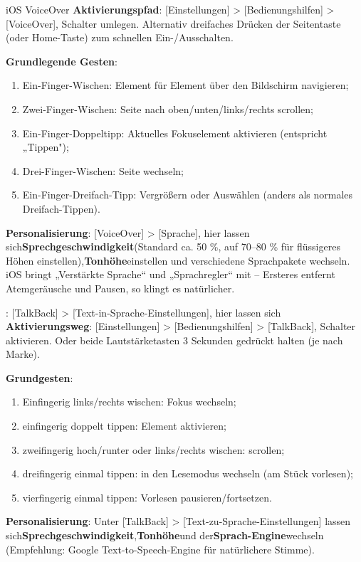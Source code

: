 \begin{tcbinfo}{iOS VoiceOver}
\textbf{Aktivierungspfad}: [Einstellungen] > [Bedienungshilfen] > [VoiceOver], Schalter umlegen. Alternativ dreifaches Drücken der Seitentaste (oder Home-Taste) zum schnellen Ein-/Ausschalten.

\textbf{Grundlegende Gesten}:

\begin{enumerate}
  \item Ein-Finger-Wischen: Element für Element über den Bildschirm navigieren;
  \item Zwei-Finger-Wischen: Seite nach oben/unten/links/rechts scrollen;
  \item Ein-Finger-Doppeltipp: Aktuelles Fokuselement aktivieren (entspricht „Tippen");
  \item Drei-Finger-Wischen: Seite wechseln;
  \item Ein-Finger-Dreifach-Tipp: Vergrößern oder Auswählen (anders als normales Dreifach-Tippen).
\end{enumerate}

\textbf{Personalisierung}: [VoiceOver] > [Sprache], hier lassen sich\textbf{Sprechgeschwindigkeit}(Standard ca. 50 \%, auf 70–80 \% für flüssigeres Höhen einstellen),\textbf{Tonhöhe}einstellen und verschiedene Sprachpakete wechseln. iOS bringt „Verstärkte Sprache“ und „Sprachregler“ mit – Ersteres entfernt Atemgeräusche und Pausen, so klingt es natürlicher.

\end{tcbinfo}

\begin{tcbinfo}{: [TalkBack] > [Text-in-Sprache-Einstellungen], hier lassen sich}
\textbf{Aktivierungsweg}: [Einstellungen] > [Bedienungshilfen] > [TalkBack], Schalter aktivieren. Oder beide Lautstärketasten 3 Sekunden gedrückt halten (je nach Marke).

\textbf{Grundgesten}:

\begin{enumerate}
  \item Einfingerig links/rechts wischen: Fokus wechseln;
  \item einfingerig doppelt tippen: Element aktivieren;
  \item zweifingerig hoch/runter oder links/rechts wischen: scrollen;
  \item dreifingerig einmal tippen: in den Lesemodus wechseln (am Stück vorlesen);
  \item vierfingerig einmal tippen: Vorlesen pausieren/fortsetzen.
\end{enumerate}

\textbf{Personalisierung}: Unter [TalkBack] > [Text-zu-Sprache-Einstellungen] lassen sich\textbf{Sprechgeschwindigkeit},\textbf{Tonhöhe}und der\textbf{Sprach-Engine}wechseln (Empfehlung: Google Text-to-Speech-Engine für natürlichere Stimme).

\end{tcbinfo}

